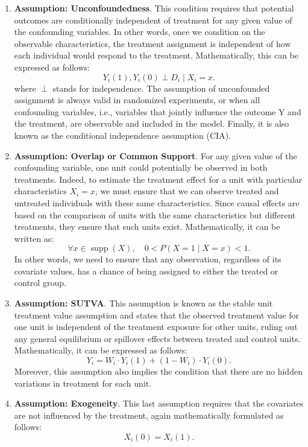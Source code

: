 \begin{enumerate}[font=\bfseries]
    \item \textbf{Assumption: Unconfoundedness}. This condition requires that potential outcomes are conditionally independent of treatment for any given value of the confounding variables. In other words, once we condition on the observable characteristics, the treatment assignment is independent of how each individual would respond to the treatment. Mathematically, this can be expressed as follows:
    \begin{equation}
        Y_{i}(1), Y_{i}(0) \perp D_{i} \mid X_{i}=x.
    \end{equation}
    where $\perp$ stands for independence. 
    The assumption of unconfounded assignment is always valid in randomized experiments, or when all confounding variables, i.e., variables that jointly influence the outcome Y and the treatment, are observable and included in the model. Finally, it is also known as the conditional independence assumption (CIA).
    \item \textbf{Assumption: Overlap or Common Support}. For any given value of the confounding variable, one unit could potentially be observed in both treatments. Indeed, to estimate the treatment effect for a unit with particular characteristics $X_i=x$, we must ensure that we can observe treated and untreated individuals with these same characteristics. Since causal effects are based on the comparison of units with the same characteristics but different treatments, they ensure that such units exist.
    Mathematically, it can be written as: 
    \begin{equation}
        \forall x \in \operatorname{supp}(X), \quad 0<P(X=1 \mid X=x)<1.
    \end{equation}
    In other words, we need to ensure that any observation, regardless of its covariate values, has a chance of being assigned to either the treated or control group.
    \item \textbf{Assumption: SUTVA}. This assumption is known as the stable unit treatment value assumption and states that the observed treatment value for one unit is independent of the treatment exposure for other units, ruling out any general equilibrium or spillover effects between treated and control units. Mathematically, it can be expressed as follows:
    \begin{equation}
    Y_i=W_i \cdot Y_i(1)+\left(1-W_i\right) \cdot Y_i(0).
    \end{equation}
    Moreover, this assumption also implies the condition that there are no hidden variations in treatment for each unit.
    \item \textbf{Assumption: Exogeneity}. This last assumption requires that the covariates are not influenced by the treatment, again mathematically formulated as follows: 
    \begin{equation}
    X_i(0)=X_i(1).
    \end{equation}
\end{enumerate}


